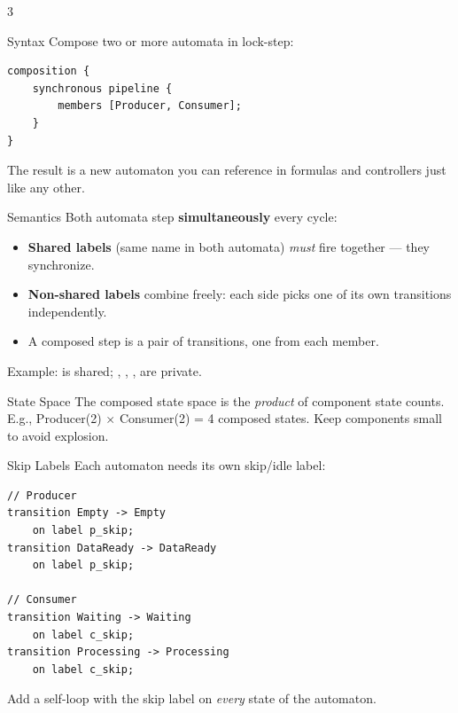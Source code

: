 



\begin{multicols}{3}
\footnotesize


\begin{cheatbox}{Syntax}
Compose two or more automata in lock-step:
\begin{lstlisting}[style=ctxdsl]
composition {
    synchronous pipeline {
        members [Producer, Consumer];
    }
}
\end{lstlisting}
The result  is a new automaton you can reference in formulas and controllers just like any other.
\end{cheatbox}

\begin{cheatbox}{Semantics}
Both automata step \textbf{simultaneously} every cycle:
\begin{itemize}
\item \textbf{Shared labels} (same name in both automata) \emph{must} fire together --- they synchronize.
\item \textbf{Non-shared labels} combine freely: each side picks one of its own transitions independently.
\item A composed step is a pair of transitions, one from each member.
\end{itemize}

\smallskip
Example:  is shared; , , ,  are private.
\end{cheatbox}

\begin{tipbox}{State Space}
The composed state space is the \emph{product} of component state counts.  E.g., Producer(2) $\times$ Consumer(2) = 4 composed states.  Keep components small to avoid explosion.
\end{tipbox}


\begin{cheatbox}{Skip Labels}
Each automaton needs its own skip/idle label:
\begin{lstlisting}[style=ctxdsl]
// Producer
transition Empty -> Empty
    on label p_skip;
transition DataReady -> DataReady
    on label p_skip;

// Consumer
transition Waiting -> Waiting
    on label c_skip;
transition Processing -> Processing
    on label c_skip;
\end{lstlisting}
Add a self-loop with the skip label on \emph{every} state of the automaton.
\end{cheatbox}


\end{multicols}
